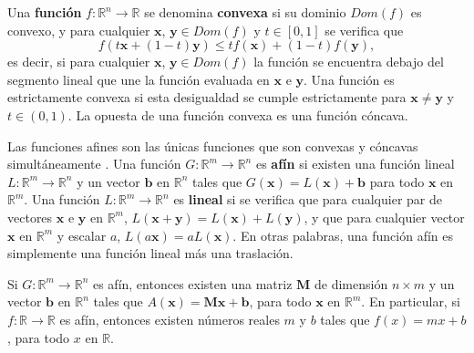 \documentclass[a4paper,12pt]{report}
\begin{document}
Una \textbf{función} $f:\mathbb{R}^n\rightarrow \mathbb{R}$ se denomina \textbf{convexa} si su dominio $Dom(f)$ es convexo, y para cualquier $\boldsymbol{x}$, $\boldsymbol{y} \in Dom(f)$ y $t \in [0,1]$ se verifica que
\begin{equation}
f(t\boldsymbol{x}+(1-t)\boldsymbol{y})\leq tf(\boldsymbol{x})+(1-t)f(\boldsymbol{y}),
\end{equation}
es decir, si para cualquier $\boldsymbol{x}$, $\boldsymbol{y} \in Dom(f)$ la función se encuentra debajo del segmento lineal que une la función evaluada en $\boldsymbol{x}$ e $\boldsymbol{y}$. Una función es estrictamente convexa si esta desigualdad se cumple estrictamente para $\boldsymbol{x} \neq \boldsymbol{y}$ y $t \in (0,1)$. La opuesta de una función convexa es una función cóncava.

Las funciones afines son las únicas funciones que son convexas y cóncavas simultáneamente \citep{boyd2004convex}. Una función $G:\mathbb{R}^m \rightarrow \mathbb{R}^n$ es \textbf{afín} si existen una función lineal $L:\mathbb{R}^m \rightarrow \mathbb{R}^n$ y un vector $\boldsymbol{b}$ en $\mathbb{R}^n$ tales que $G(\boldsymbol{x})=L(\boldsymbol{x})+\boldsymbol{b}$ para todo $\boldsymbol{x}$ en $\mathbb{R}^m$. Una función $L:\mathbb{R}^m \rightarrow \mathbb{R}^n$ es \textbf{lineal} si se verifica que para cualquier par de vectores $\boldsymbol{x}$ e $\boldsymbol{y}$ en $\mathbb{R}^m$, $L(\boldsymbol{x}+\boldsymbol{y})=L(\boldsymbol{x})+L(\boldsymbol{y})$, y que para cualquier vector $\boldsymbol{x}$ en $\mathbb{R}^m$ y escalar $a$, $L(a\boldsymbol{x})=aL(\boldsymbol{x})$. En otras palabras, una función afín es simplemente una función lineal más una traslación. 

Si $G:\mathbb{R}^m \rightarrow \mathbb{R}^n$ es afín, entonces existen una matriz $\boldsymbol{M}$ de dimensión $n \times m$ y un vector $\boldsymbol{b}$ en $\mathbb{R}^n$ tales que $A(\boldsymbol{x})=\boldsymbol{M}\boldsymbol{x}+\boldsymbol{b}$, para todo $\boldsymbol{x}$ en $\mathbb{R}^m$. En particular, si $f:\mathbb{R}\rightarrow\mathbb{R}$ es afín, entonces existen números reales $m$ y $b$ tales que $f(x)=mx+b$, para todo $x$ en $\mathbb{R}$.
\end{document}
